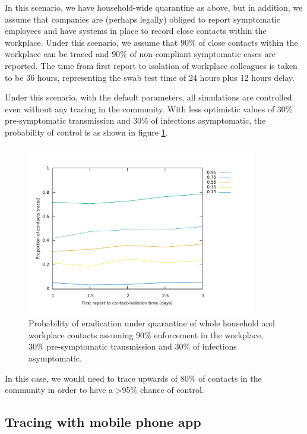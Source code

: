 \documentclass{article}
\begin{document}
In this scenario, we have household-wide quarantine as above, but in addition, we assume that companies are (perhaps legally) obliged to report symptomatic employees and have systems in place to record close contacts within the workplace. Under this scenario, we assume that $90\%$ of close contacts within the workplace can be traced and $90\%$ of non-compliant symptomatic cases are reported. The time from first report to isolation of workplace colleagues is taken to be 36 hours, representing the swab test time of 24 hours plus 12 hours delay.

Under this scenario, with the default parameters, all simulations are controlled even without any tracing in the community. With less optimistic values of 30\% pre-symptomatic transmission and 30\% of infections asymptomatic, the probability of control is as shown in figure \ref{householdWorkplace3030}.

\begin{figure}
\begin{center}
\includegraphics[width = 10cm]{contourWorkplace.pdf}
\end{center}
\caption{Probability of eradication under quarantine of whole household and workplace contacts assuming 90\% enforcement in the workplace, 30\% pre-symptomatic transmission and 30\% of infections asymptomatic.}
\label{householdWorkplace3030}
\end{figure}

In this case, we would need to trace upwards of 80\% of contacts in the community in order to have a >95\% chance of control.

\subsection{Tracing with mobile phone app}
\end{document}

